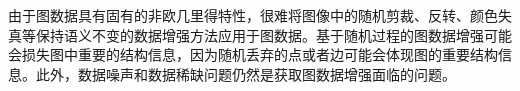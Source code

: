由于图数据具有固有的非欧几里得特性，很难将图像中的随机剪裁、反转、颜色失真等保持语义不变的数据增强方法应用于图数据。基于随机过程的图数据增强可能会损失图中重要的结构信息，因为随机丢弃的点或者边可能会体现图的重要结构信息。此外，数据噪声和数据稀缺问题仍然是获取图数据增强面临的问题。
%
%
